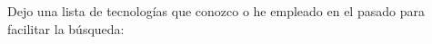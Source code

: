 \documentclass[9pt]{developercv} %
\begin{document}


Dejo una lista de tecnologías que conozco o he empleado en el pasado para facilitar la búsqueda:\\
\end{document}
